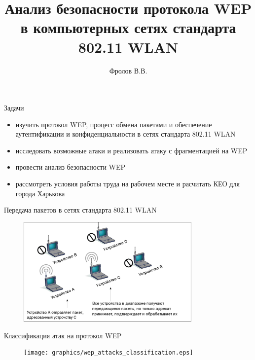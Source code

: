\documentclass[12pt]{beamer}
\begin{document}
\title{Анализ безопасности протокола WEP в компьютерных сетях стандарта 802.11 WLAN}
\author{Фролов В.В.}
\date{}

\frame{\titlepage} 


\begin{frame}{Задачи}

\begin{itemize}
    \item изучить протокол WEP, процесс обмена пакетами и обеспечение аутентификации и конфиденциальности в сетях стандарта 802.11 WLAN
    \item исследовать возможные атаки и реализовать атаку с фрагментацией на WEP
    \item провести анализ безопасности WEP
    \item рассмотреть условия работы труда на рабочем месте и расчитать КЕО для города Харькова
\end{itemize}

\end{frame} 


\begin{frame}{Передача пакетов в сетях стандарта 802.11 WLAN}

\begin{figure}
    \includegraphics[width=9cm]{graphics/wlan_diagram.eps}
\end{figure}

\end{frame} 


\begin{frame}{Классификация атак на протокол WEP}

\begin{figure}
    \texttt{[image: graphics/wep\_attacks\_classification.eps]}
\end{figure}


\end{frame} 
\end{document}
